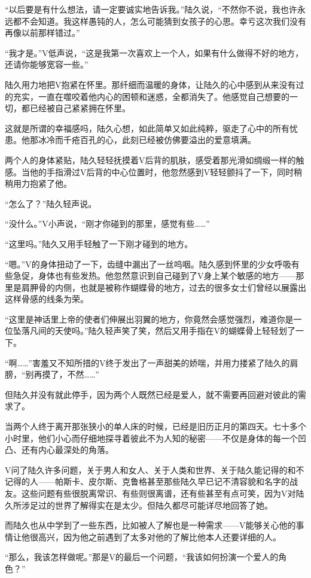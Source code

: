 “以后要是有什么想法，请一定要诚实地告诉我。”陆久说，“不然你不说，我也许永远都不会知道。我这样愚钝的人，怎么可能猜到女孩子的心思。幸亏这次我们没有再像以前那样错过。”

“我才是。”V低声说，“这是我第一次喜欢上一个人，如果有什么做得不好的地方，还请你能够宽容一些。”

陆久用力地把V抱紧在怀里。那纤细而温暖的身体，让陆久的心中感到从来没有过的充实，一直在噬咬着他内心的困顿和迷惑，全都消失了。他感觉自己想要的一切，都已经被自己紧紧拥在怀里。

这就是所谓的幸福感吗，陆久心想，如此简单又如此纯粹，驱走了心中的所有忧患。他那冰冷而千疮百孔的心，此刻已经被仿佛要溢出的爱意填满。

两个人的身体紧贴，陆久轻轻抚摸着V后背的肌肤，感受着那光滑如绸缎一样的触感。当他的手指滑过V后背的中心位置时，他忽然感到V轻轻颤抖了一下，同时稍稍用力抱紧了他。

“怎么了？”陆久轻声说。

“没什么。”V小声说，“刚才你碰到的那里，感觉有些……”

“这里吗。”陆久又用手轻触了一下刚才碰到的地方。

“嗯。”V的身体扭动了一下，齿缝中漏出了一丝呜咽。陆久感到怀里的少女呼吸有些急促，身体也有些发热。他忽然意识到自己碰到了V身上某个敏感的地方——那里是肩胛骨的内侧，也就是被称作蝴蝶骨的地方，过去的很多女士们曾经以展露出这样骨感的线条为荣。

“这里是神话里上帝的使者们伸展出羽翼的地方，你竟然会感觉强烈，难道你是一位坠落凡间的天使吗。”陆久轻声笑了笑，然后又用手指在V的蝴蝶骨上轻轻划了一下。

“啊……”害羞又不知所措的V终于发出了一声甜美的娇喘，并用力搂紧了陆久的肩膀，“别再摸了，不然……”

但陆久并没有就此停手，因为两个人既然已经是爱人，就不需要再回避对彼此的需求了。

当两个人终于离开那张狭小的单人床的时候，已经是旧历正月的第四天。七十多个小时里，他们小心而仔细地探寻着彼此不为人知的秘密——不仅是身体的每一个凹凸、还有内心最深处的角落。

V问了陆久许多问题，关于男人和女人、关于人类和世界、关于陆久能记得的和不记得的人——帕斯卡、皮尔斯、克鲁格甚至那些陆久早已记不清容貌和名字的战友。这些问题有些很脱离常识、有些则很离谱，还有些甚至有点可笑，因为V对陆久所涉足过的世界了解得实在是太少。但陆久都尽可能详尽地回答了她。

而陆久也从中学到了一些东西，比如被人了解也是一种需求——V能够关心他的事情让他很高兴，因为他之前遇到了太多对他的了解比他本人还要详细的人。

“那么，我该怎样做呢。”那是V的最后一个问题，“我该如何扮演一个爱人的角色？”

